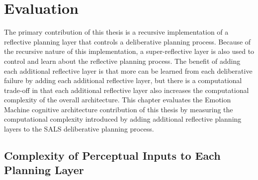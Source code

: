 \chapter{Evaluation}
\label{chapter:evaluation}

The primary contribution of this thesis is a recursive implementation
of a reflective planning layer that controls a deliberative planning
process.  Because of the recursive nature of this implementation, a
super-reflective layer is also used to control and learn about the
reflective planning process.  The benefit of adding each additional
reflective layer is that more can be learned from each deliberative
failure by adding each additional reflective layer, but there is a
computational trade-off in that each additional reflective layer also
increases the computational complexity of the overall architecture.
This chapter evaluates the Emotion Machine cognitive architecture
contribution of this thesis by measuring the computational complexity
introduced by adding additional reflective planning layers to the SALS
deliberative planning process.

\section{Complexity of Perceptual Inputs to Each Planning Layer}

